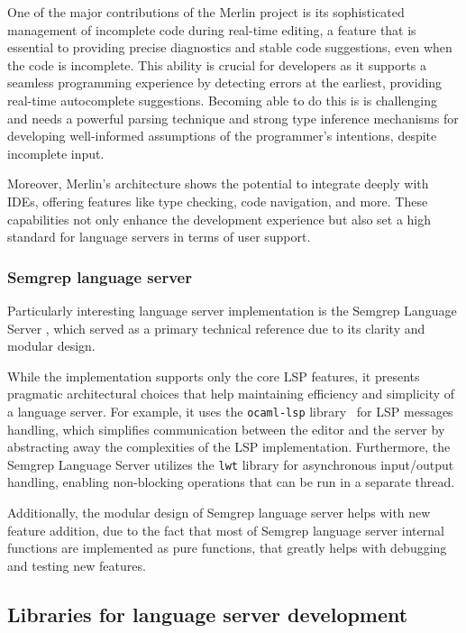 One of the major contributions of the Merlin project is its sophisticated
management of incomplete code during real-time editing, a feature that is
essential to providing precise diagnostics and stable code suggestions, even when
the code is incomplete. This ability is crucial for developers as it supports a
seamless programming experience by detecting errors at the earliest, providing
real-time autocomplete suggestions. Becoming able to do this is is challenging
and needs a powerful parsing technique and strong type inference mechanisms for
developing well-informed assumptions of the programmer's intentions, despite
incomplete input.

Moreover, Merlin's architecture shows the potential to integrate deeply with
IDEs, offering features like type checking, code navigation, and more. These
capabilities not only enhance the development experience but also set a high
standard for language servers in terms of user support. 

\subsubsection*{Semgrep language server}

Particularly interesting language server implementation is the Semgrep Language Server
\cite{gh-semgrep-lsp}, which served as a primary technical reference due to its
clarity and modular design. 

While the implementation supports only the core LSP features, it presents
pragmatic architectural choices that help maintaining efficiency and simplicity
of a language server. For example, it uses the \texttt{ocaml-lsp}
library~\cite{opam-ocaml-lsp} for LSP messages handling, which simplifies
communication between the editor and the server by abstracting away the
complexities of the LSP implementation. Furthermore, the Semgrep Language Server
utilizes the \texttt{lwt} library \cite{opam-lwt} for asynchronous input/output
handling, enabling non-blocking operations that can be run in a separate thread.

Additionally, the modular design of Semgrep language server helps with 
new feature addition, due to the fact that most of Semgrep language server 
internal functions are implemented as pure functions, that greatly helps 
with debugging and testing new features.

\subsection{Libraries for language server development}

